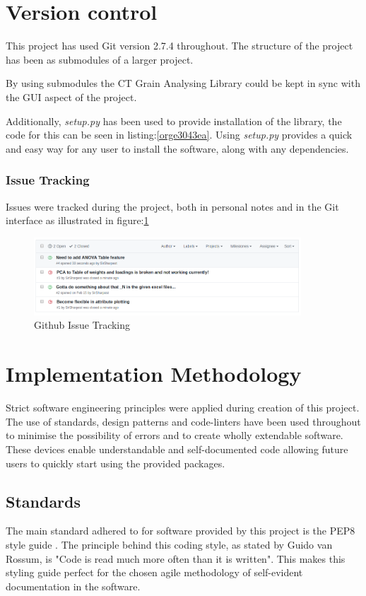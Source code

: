 \documentclass[11pt]{report}
\begin{document}
\section{Version control}
\label{sec:orgd2af88d}
This project has used Git version 2.7.4 throughout. The structure of the project has been as submodules of a larger project.

By using submodules the CT Grain Analysing Library could be kept in sync with the GUI aspect of the project.

Additionally, \emph{setup.py} has been used to provide installation of the library, the code for this can be seen in listing:\ref{orge3043ea}. Using \emph{setup.py} provides a quick and easy way for any user to install the software, along with any dependencies.

\subsubsection{Issue Tracking}
\label{sec:orgf13f0a8}
Issues were tracked during the project, both in personal notes and in the Git interface as illustrated in figure:\ref{fig:org8d72fd9}
\begin{figure}[htbp]
\centering
\includegraphics[width=10cm]{./images/github.png}
\caption{\label{fig:org8d72fd9}
Github Issue Tracking}
\end{figure}

\section{Implementation Methodology}
\label{sec:org9caaa92}
Strict software engineering principles were applied during creation of this project. The use of standards, design patterns and code-linters have been used throughout to minimise the possibility of errors and to create wholly extendable software. These devices enable understandable and self-documented code allowing future users to quickly start using the provided packages.
\subsection{Standards}
\label{sec:orgc4ba155}
The main standard adhered to for software provided by this project is the PEP8 style guide \cite{VanRossum}. The principle behind this coding style, as stated by Guido van Rossum, is "Code is read much more often than it is written". This makes this styling guide perfect for the chosen agile methodology of self-evident documentation in the software.
\end{document}
